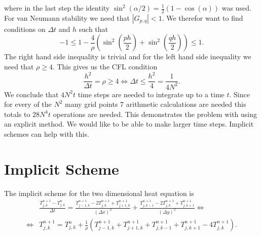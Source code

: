 \documentclass[a4aper,pagesize]{article}
\theoremstyle{definition}
\theoremstyle{plain}
\theoremstyle{remark}
\begin{document}
where in the last step the identity $\sin^2(\alpha/2) = \frac{1}{2}(1-\cos(\alpha))$ was used. For van Neumann stability we need that $|G_{p,q}|<1$. We therefor want to find conditions on $\Delta t$ and $h$ such that
\begin{equation}
-1 \le
	1-\frac{4}{\rho} \left(
		  \sin^2\left(\frac{ph}{2}\right)
	    + \sin^2\left(\frac{qh}{2}\right)
	\right)
	\le 1.
\end{equation}
The right hand side inequality is trivial and for the left hand side inequality we need that $\rho \geq 4$. This gives us the CFL condition
\begin{equation}
	\frac{h^2}{\Delta t} = \rho \geq 4 \Leftrightarrow \Delta t \leq \frac{h^2}{4} = \frac{1}{4N^2}.
\end{equation}
We conclude that $4N^2t$ time steps are needed to integrate up to a time $t$. Since for every of the $N^2$ many grid points $7$ arithmetic calculations are needed this totals to $28N^4t$ operations are needed. This demonstrates the problem with using an explicit method. We would like to be able to make larger time steps. Implicit schemes can help with this.

\section{Implicit Scheme}
The implicit scheme for the two dimensional heat equation is
\begin{align}
	&\frac{T_{j,k}^{n+1} - T_{j,k}^{n}}{\Delta t}
	= \frac{T_{j-1,k}^{n+1} - 2 T_{j,k}^{n+1} + T_{j+1,k}^{n+1}}{(\Delta x)^2}
	+ \frac{T_{j,k-1}^{n+1} - 2 T_{j,k}^{n+1} + T_{j,k+1}^{n+1}}{(\Delta y)^2}
\Leftrightarrow\\
\Leftrightarrow
	&T_{j,k}^{n+1}
	= T_{j,k}^{n}
	+ \frac{1}{\rho} \left(
		T_{j-1,k}^{n+1}
		+ T_{j+1,k}^{n+1}
		+ T_{j,k-1}^{n+1}
		+ T_{j,k+1}^{n+1}
		- 4 T_{j,k}^{n+1}
	\right).
\end{align}
\end{document}
